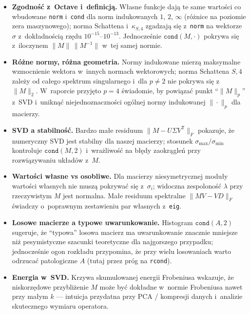 \documentclass[polish]{template/projectreport}
\begin{document}
\begin{itemize}
  \item \textbf{Zgodność z~Octave i~definicją.} Własne funkcje dają te same wartości co wbudowane \texttt{norm} i~\texttt{cond} dla norm indukowanych $1$, $2$, $\infty$ (różnice na poziomie zera maszynowego); norma Schattena i~$\kappa_{S,4}$ zgadzają się z~\texttt{norm} na wektorze~$\sigma$ z~dokładnością rzędu $10^{-15}$--$10^{-13}$. Jednocześnie $\texttt{cond}(M,\cdot)$ pokrywa się z~iloczynem $\|M\|\,\|M^{-1}\|$ w~tej samej normie.
  \item \textbf{Różne normy, różna geometria.} Normy indukowane mierzą maksymalne wzmocnienie wektora w~innych normach wektorowych; norma Schattena $S{,}4$ zależy od całego spektrum singularnego i~dla $p\neq 2$ nie pokrywa się z~$\|M\|_2$. W~raporcie przyjęto $p=4$ świadomie, by powiązać punkt ``$\|M\|_p$'' z~SVD i~uniknąć niejednoznaczności ogólnej normy indukowanej $\|\cdot\|_p$ dla macierzy.
  \item \textbf{SVD a stabilność.} Bardzo małe residuum $\|M-U\Sigma V^{\mathsf T}\|_F$ pokazuje, że numeryczny SVD jest stabilny dla naszej macierzy; stosunek $\sigma_{\max}/\sigma_{\min}$ kontroluje $\texttt{cond}(M,2)$ i~wrażliwość na błędy zaokrągleń przy rozwiązywaniu układów z~$M$.
  \item \textbf{Wartości własne vs osobliwe.} Dla macierzy niesymetrycznej moduły wartości własnych nie muszą pokrywać się z~$\sigma_i$; widoczna zespoloność $\lambda$ przy rzeczywistym $M$ jest normalna. Małe residuum spektralne $\|MV-VD\|_F$ świadczy o~poprawnym zestawieniu par własnych z~\texttt{eig}.
  \item \textbf{Losowe macierze a typowe uwarunkowanie.} Histogram $\texttt{cond}(A,2)$ sugeruje, że ``typowa'' losowa macierz ma uwarunkowanie znacznie mniejsze niż pesymistyczne szacunki teoretyczne dla najgorszego przypadku; jednocześnie ogon rozkładu przypomina, że przy wielu losowaniach warto odrzucać patologiczne $A$ (tutaj przez próg na \texttt{rcond}).
  \item \textbf{Energia w~SVD.} Krzywa skumulowanej energii Frobeniusa wskazuje, że niskorzędowe przybliżenie $M$ może być dokładne w~normie Frobeniusa nawet przy małym $k$ --- intuicja przydatna przy PCA / kompresji danych i~analizie skutecznego wymiaru operatora.
\end{itemize}
\end{document}
